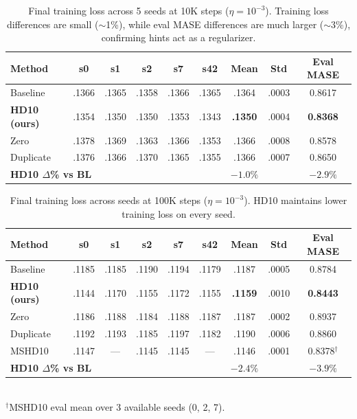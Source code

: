 \documentclass{article}
\begin{document}
\begin{table}[h]
\centering
\caption{Final training loss across 5 seeds at 10K steps ($\eta = 10^{-3}$). Training loss differences are small ($\sim$1\%), while eval MASE differences are much larger ($\sim$3\%), confirming hints act as a regularizer.}
\small
\begin{tabular}{lcccccccc}
\toprule
\textbf{Method} & \textbf{s0} & \textbf{s1} & \textbf{s2} & \textbf{s7} & \textbf{s42} & \textbf{Mean} & \textbf{Std} & \textbf{Eval MASE} \\
\midrule
Baseline & .1366 & .1365 & .1358 & .1366 & .1365 & .1364 & .0003 & 0.8617 \\
\textbf{HD10 (ours)} & .1354 & .1350 & .1350 & .1353 & .1343 & \textbf{.1350} & .0004 & \textbf{0.8368} \\
Zero & .1378 & .1369 & .1363 & .1366 & .1353 & .1366 & .0008 & 0.8578 \\
Duplicate & .1376 & .1366 & .1370 & .1365 & .1355 & .1366 & .0007 & 0.8650 \\
\midrule
\multicolumn{2}{l}{\textbf{HD10 $\Delta$\% vs BL}} & & & & & $-1.0\%$ & & $-2.9\%$ \\
\bottomrule
\end{tabular}
\end{table}

\begin{table}[h]
\centering
\caption{Final training loss across seeds at 100K steps ($\eta = 10^{-3}$). HD10 maintains lower training loss on every seed.}
\small
\begin{tabular}{lcccccccc}
\toprule
\textbf{Method} & \textbf{s0} & \textbf{s1} & \textbf{s2} & \textbf{s7} & \textbf{s42} & \textbf{Mean} & \textbf{Std} & \textbf{Eval MASE} \\
\midrule
Baseline & .1185 & .1185 & .1190 & .1194 & .1179 & .1187 & .0005 & 0.8784 \\
\textbf{HD10 (ours)} & .1144 & .1170 & .1155 & .1172 & .1155 & \textbf{.1159} & .0010 & \textbf{0.8443} \\
Zero & .1186 & .1188 & .1184 & .1188 & .1187 & .1187 & .0002 & 0.8937 \\
Duplicate & .1192 & .1193 & .1185 & .1197 & .1182 & .1190 & .0006 & 0.8860 \\
MSHD10 & .1147 & --- & .1145 & .1145 & --- & .1146 & .0001 & 0.8378$^\dagger$ \\
\midrule
\multicolumn{2}{l}{\textbf{HD10 $\Delta$\% vs BL}} & & & & & $-2.4\%$ & & $-3.9\%$ \\
\bottomrule
\end{tabular}
\\[2pt]
{\footnotesize $^\dagger$MSHD10 eval mean over 3 available seeds (0, 2, 7).}
\end{table}
\end{document}
